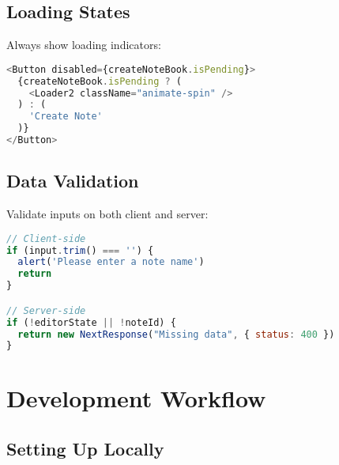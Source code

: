 \documentclass[11pt,a4paper]{article}
\begin{document}
\subsection{Loading States}

Always show loading indicators:

\begin{lstlisting}[language=JavaScript]
<Button disabled={createNoteBook.isPending}>
  {createNoteBook.isPending ? (
    <Loader2 className="animate-spin" />
  ) : (
    'Create Note'
  )}
</Button>
\end{lstlisting}

\subsection{Data Validation}

Validate inputs on both client and server:

\begin{lstlisting}[language=JavaScript]
// Client-side
if (input.trim() === '') {
  alert('Please enter a note name')
  return
}

// Server-side
if (!editorState || !noteId) {
  return new NextResponse("Missing data", { status: 400 })
}
\end{lstlisting}


\section{Development Workflow}

\subsection{Setting Up Locally}
\end{document}
